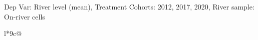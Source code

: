 \begin{table}[H]
\captionlistentry[table]{}
\label{table:beaver_hydrometry_DVlevel_mean_SCg123}
\tiny %
Dep Var: River level (mean), Treatment Cohorts: 2012, 2017, 2020, River sample: On-river cells \\
\begin{threeparttable}
\begin{tabulary}{\textwidth}{l*{9}{c}@{}}
\toprule \toprule
\noalign{\smallskip}
\noalign{\smallskip}
\midrule \bottomrule
\end{tabulary}
\medskip
\end{threeparttable}
\end{table}
